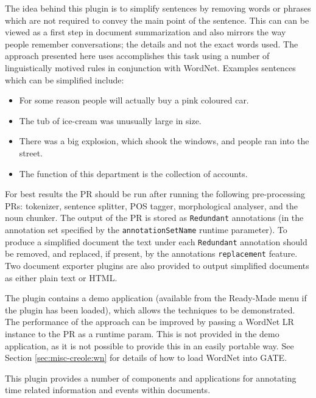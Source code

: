 The idea behind this plugin is to simplify sentences by removing words or
phrases which are not required to convey the main point of the sentence.
This can can be viewed as a first step in document summarization and also
mirrors the way people remember conversations; the details and not the
exact words used. The approach presented here uses accomplishes this task
using a number of linguistically motived rules in conjunction with WordNet.
Examples sentences which can be simplified include:

\begin{itemize}
\item For some reason people will actually buy a pink coloured car.
\item The tub of ice-cream was unusually large in size.
\item There was a big explosion, which shook the windows, and people ran into the street.
\item The function of this department is the collection of accounts.
\end{itemize}

For best results the PR should be run after running the following pre-processing
PRs: tokenizer, sentence splitter, POS tagger, morphological analyser, and the
noun chunker. The output of the PR is stored as \verb|Redundant| annotations (in the
annotation set specified by the \verb|annotationSetName| runtime parameter). To produce
a simplified document the text under each \verb|Redundant| annotation should be removed,
and replaced, if present, by the annotations \verb|replacement| feature. Two document
exporter plugins are also provided to output simplified documents as either plain text
or HTML.

The plugin contains a demo application (available from the Ready-Made menu if
the plugin has been loaded), which allows the techniques to be demonstrated.
The performance of the approach can be improved by passing a WordNet LR
instance to the PR as a runtime param. This is not provided in the demo
application, as it is not possible to provide this in an easily portable way.
See Section \ref{sec:misc-creole:wn} for details of how to load WordNet into
GATE.

%
%
This plugin provides a number of components and applications for annotating time
related information and events within documents.

